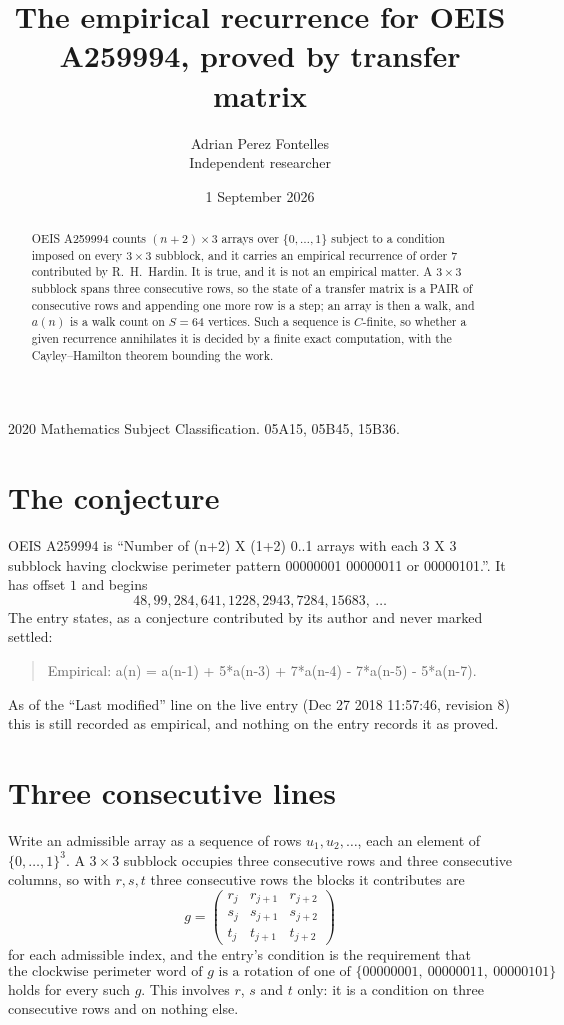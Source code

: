 \documentclass[11pt,a4paper]{article}
\title{The empirical recurrence for OEIS A259994, proved by transfer matrix}
\author{Adrian Perez Fontelles\\ \small Independent researcher}
\date{1 September 2026}
\theoremstyle{plain}
\theoremstyle{definition}
\begin{document}
\maketitle

\begin{abstract}
OEIS A259994 counts $(n+2)\times3$ arrays over $\{0,\dots,1\}$ subject to a condition imposed on
every $3\times3$ subblock, and it carries an empirical recurrence of order $7$
contributed by R.~H.~Hardin. It is true, and it is not an empirical matter. A $3\times3$
subblock spans three consecutive rows, so the state of a transfer matrix is a PAIR of
consecutive rows and appending one more row is a step; an array is then a walk, and
$a(n)$ is a walk count on $S=64$ vertices. Such a sequence is $C$-finite, so whether a given
recurrence annihilates it is decided by a finite exact computation, with the Cayley--Hamilton
theorem bounding the work.
\end{abstract}

\noindent\small 2020 Mathematics Subject Classification. 05A15, 05B45, 15B36.\normalsize

\section{The conjecture}

OEIS A259994 is ``Number of (n+2) X (1+2) 0..1 arrays with each 3 X 3 subblock having clockwise perimeter pattern 00000001 00000011 or 00000101.''. It has offset $1$ and begins
\[
48, 99, 284, 641, 1228, 2943, 7284, 15683,\ \dots
\]
The entry states, as a conjecture contributed by its author and never marked settled:
\begin{quote}
Empirical: a(n) = a(n-1) + 5*a(n-3) + 7*a(n-4) - 7*a(n-5) - 5*a(n-7).
\end{quote}
As of the ``Last modified'' line on the live entry (Dec 27 2018 11:57:46, revision 8) this is still
recorded as empirical, and nothing on the entry records it as proved.

\section{Three consecutive lines}

Write an admissible array as a sequence of rows $u_1,u_2,\dots$, each an element of
$\{0,\dots,1\}^{3}$. A $3\times3$ subblock occupies three consecutive rows and
three consecutive columns, so with $r,s,t$ three consecutive rows the blocks it
contributes are
\[
g=\begin{pmatrix}r_j&r_{j+1}&r_{j+2}\\ s_j&s_{j+1}&s_{j+2}\\ t_j&t_{j+1}&t_{j+2}\end{pmatrix}
\]
for each admissible index, and the entry's condition is the requirement that
\[
\text{the clockwise perimeter word of }g\text{ is a rotation of one of }\{00000001,\ 00000011,\ 00000101\}
\]
holds for every such $g$. This involves $r$, $s$ and $t$ only: it is a condition on
three consecutive rows and on nothing else.
\end{document}
